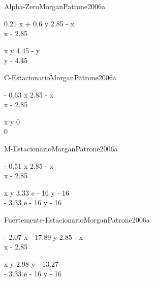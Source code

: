 
\begin{bilevelmodel}{Alpha-Zero}{MorganPatrone2006a}
    \begin{upperlevel}{0.21 x + 0.6 y}{
         2.85 - x  \\ 
 x - 2.85 
    }
    \end{upperlevel}
    \begin{lowerlevel}{x y}{
         4.45 - y  \\ 
 y - 4.45 
    }
    \end{lowerlevel}
\end{bilevelmodel}
    
        


\begin{bilevelmodel}{C-Estacionario}{MorganPatrone2006a}
    \begin{upperlevel}{- 0.63 x}{
         2.85 - x  \\ 
 x - 2.85 
    }
    \end{upperlevel}
    \begin{lowerlevel}{x y}{
         0  \\ 
 0 
    }
    \end{lowerlevel}
\end{bilevelmodel}
    
        

\begin{bilevelmodel}{M-Estacionario}{MorganPatrone2006a}
    \begin{upperlevel}{- 0.51 x}{
         2.85 - x  \\ 
 x - 2.85 
    }
    \end{upperlevel}
    \begin{lowerlevel}{x y}{
         3.33 e - 16 y - 16  \\ 
 - 3.33 e - 16 y - 16 
    }
    \end{lowerlevel}
\end{bilevelmodel}
    
        

\begin{bilevelmodel}{Fuertemente-Estacionario}{MorganPatrone2006a}
    \begin{upperlevel}{- 2.07 x - 17.89 y}{
         2.85 - x  \\ 
 x - 2.85 
    }
    \end{upperlevel}
    \begin{lowerlevel}{x y}{
         2.98 y - 13.27  \\ 
 - 3.33 e - 16 y - 16 
    }
    \end{lowerlevel}
\end{bilevelmodel}
    
        

